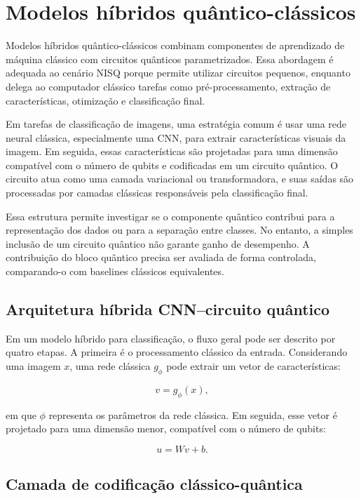 \documentclass[
    12pt,
    openright,
    oneside,
    a4paper,
    english,
    brazil
]{abntex2}
\begin{document}
\section{Modelos híbridos quântico-clássicos}

Modelos híbridos quântico-clássicos combinam componentes de aprendizado de máquina clássico com circuitos quânticos parametrizados. Essa abordagem é adequada ao cenário NISQ porque permite utilizar circuitos pequenos, enquanto delega ao computador clássico tarefas como pré-processamento, extração de características, otimização e classificação final.

Em tarefas de classificação de imagens, uma estratégia comum é usar uma rede neural clássica, especialmente uma CNN, para extrair características visuais da imagem. Em seguida, essas características são projetadas para uma dimensão compatível com o número de qubits e codificadas em um circuito quântico. O circuito atua como uma camada variacional ou transformadora, e suas saídas são processadas por camadas clássicas responsáveis pela classificação final.

Essa estrutura permite investigar se o componente quântico contribui para a representação dos dados ou para a separação entre classes. No entanto, a simples inclusão de um circuito quântico não garante ganho de desempenho. A contribuição do bloco quântico precisa ser avaliada de forma controlada, comparando-o com baselines clássicos equivalentes.

\subsection{Arquitetura híbrida CNN--circuito quântico}

Em um modelo híbrido para classificação, o fluxo geral pode ser descrito por quatro etapas. A primeira é o processamento clássico da entrada. Considerando uma imagem \(x\), uma rede clássica \(g_{\phi}\) pode extrair um vetor de características:

\[
v = g_{\phi}(x),
\]

em que \(\phi\) representa os parâmetros da rede clássica. Em seguida, esse vetor é projetado para uma dimensão menor, compatível com o número de qubits:

\[
u = Wv + b.
\]

\subsection{Camada de codificação clássico-quântica}
\label{subsec:camada_codificacao_classico_quantica}
\end{document}
